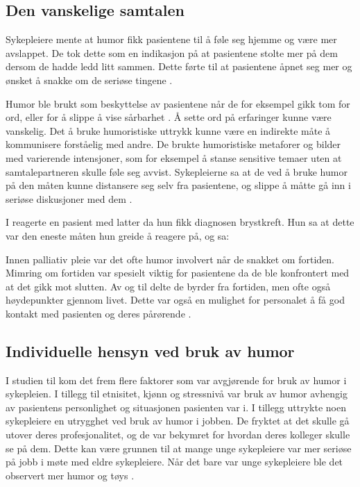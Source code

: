 \subsection{Den vanskelige samtalen}

Sykepleiere mente at humor fikk pasientene til å føle seg hjemme og være mer
avslappet. De tok dette som en indikasjon på at pasientene stolte mer på dem
dersom de hadde ledd litt sammen. Dette førte til at pasientene åpnet seg mer
og ønsket å snakke om de seriøse tingene \cite{tanay2014}.

Humor ble brukt som beskyttelse av pasientene når de for eksempel gikk tom for
ord, eller for å slippe å vise sårbarhet . Å sette ord på
erfaringer kunne være vanskelig. Det å bruke humoristiske uttrykk kunne være en
indirekte måte å kommunisere forståelig med andre. De brukte humoristiske
metaforer og bilder med varierende intensjoner, som for eksempel å stanse
sensitive temaer uten at samtalepartneren skulle føle seg avvist.  Sykepleierne
sa at de ved å bruke humor på den måten kunne distansere seg selv fra
pasientene, og slippe å måtte gå inn i seriøse diskusjoner med dem
\cite{dean2008}.

I  reagerte en pasient med latter da hun fikk diagnosen
brystkreft. Hun sa at dette var den eneste måten hun greide å reagere på, og
sa: 

Innen palliativ pleie var det ofte humor involvert når de snakket om fortiden.
Mimring om fortiden var spesielt viktig for pasientene da de ble konfrontert
med at det gikk mot slutten. Av og til delte de byrder fra fortiden, men ofte
også høydepunkter gjennom livet. Dette var også en mulighet for personalet å få
god kontakt med pasienten og deres pårørende \cite{dean2005}.

\subsection{Individuelle hensyn ved bruk av humor}

I studien til  kom det frem flere faktorer som var
avgjørende for bruk av humor i sykepleien. I tillegg til etnisitet, kjønn og
stressnivå var bruk av humor avhengig av pasientens personlighet og situasjonen
pasienten var i. I tillegg uttrykte noen sykepleiere en utrygghet ved bruk av
humor i jobben. De fryktet at det skulle gå utover deres profesjonalitet, og de
var bekymret for hvordan deres kolleger skulle se på dem. Dette kan være
grunnen til at mange unge sykepleiere var mer seriøse på jobb i møte med eldre
sykepleiere. Når det bare var unge sykepleiere ble det observert mer humor og
tøys \cite{tanay2014}.

